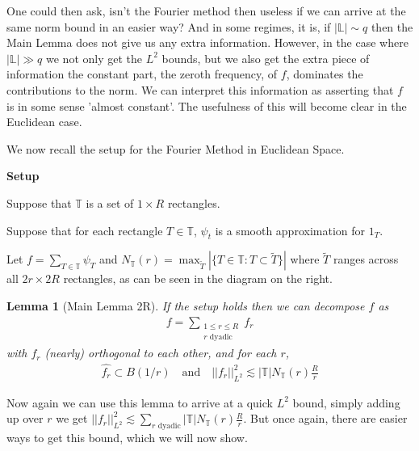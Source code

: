 \documentclass[12pt]{amsart}
\newtheorem{lemma}[theorem]{Lemma}
\newcommand{\LL}{\mathbb{L}}
\newcommand{\TT}{\mathbb{T}}
\begin{document}
One could then ask, isn't the Fourier method then useless if we can arrive at the same norm bound in an easier way? And in some regimes, it is, if $|\LL| \sim q$ then the Main Lemma does not give us any extra information. However, in the case where $|\LL| \gg q$ we not only get the $L^2$ bounds, but we also get the extra piece of information the constant part, the zeroth frequency, of $f$, dominates the contributions to the norm. We can interpret this information as asserting that $f$ is in some sense 'almost constant'. The usefulness of this will become clear in the Euclidean case.

\begin{figure}

\end{figure}

We now recall the setup for the Fourier Method in Euclidean Space.

{\bf Setup}

Suppose that $\TT$ is a set of $1 \times R$ rectangles.

Suppose that for each rectangle $T \in \TT$, $\psi_t$ is a smooth approximation for $1_T$. 

Let $f = \sum_{T \in \TT} \psi_T$ and $N_\TT (r) = \max_{\tilde{T}} |\{ T \in \TT : T \subset \tilde{T}\}|$ where $\tilde{T}$ ranges across all $2 r \times 2 R$ rectangles, as can be seen in the diagram on the right.

\begin{lemma} [Main Lemma 2R]
    If the setup holds then we can decompose $f$ as 
    \begin{align*}
        f = \sum_{\substack{1 \leq r \leq R\\ r \text{ dyadic}}} f_r
    \end{align*}
    with $f_r$ (nearly) orthogonal to each other, and for each $r$,
    \begin{align*}
        \hat{f_r} \subset B(1/r) \quad \text{and} \quad ||f_r||^2_{L^2} \lesssim |\TT| N_\TT (r) \frac{R}{r}
    \end{align*}
\end{lemma}
Now again we can use this lemma to arrive at a quick $L^2$ bound, simply adding up over $r$ we get
$
    ||f_r||^2_{L^2} \lesssim \sum_{r \text{ dyadic}} |\TT| N_\TT (r) \frac{R}{r}.
$
But once again, there are easier ways to get this bound, which we will now show.
\end{document}
